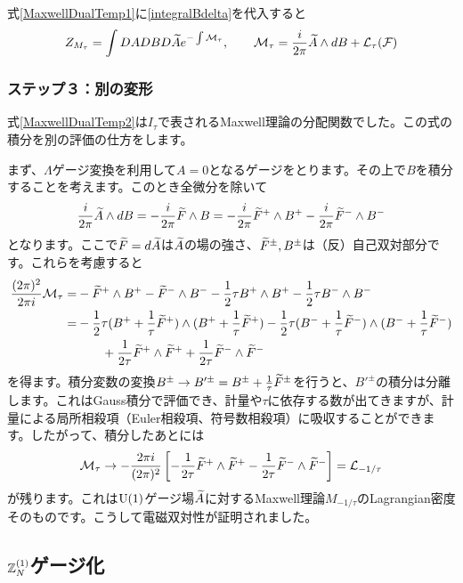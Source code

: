 \documentclass[generalized_symmetry.tex]{subfiles}
\begin{document}
式\eqref{MaxwellDualTemp1}に\eqref{integralBdelta}を代入すると
\begin{align}
  Z_{M_{\tau}}= \int DA DB D\widetilde{A} e^{-\int \mathcal{M}_{\tau}},\qquad \mathcal{M}_{\tau}=\frac{i}{2\pi}\widetilde{A} \wedge dB+\mathcal{L}_{\tau}(\mathcal{F})\label{MaxwellDualTemp2}
\end{align}

\subsubsection{ステップ３：別の変形}
式\eqref{MaxwellDualTemp2}は$I_{\tau}$で表されるMaxwell理論の分配関数でした。この式の積分を別の評価の仕方をします。

まず、$\Lambda$ゲージ変換を利用して$A=0$となるゲージをとります。その上で$B$を積分することを考えます。このとき全微分を除いて
\begin{align}
  \frac{i}{2\pi}\widetilde{A} \wedge dB=
  -\frac{i}{2\pi}\widetilde{F} \wedge B=
  -\frac{i}{2\pi}\widetilde{F}^{+} \wedge B^{+} -\frac{i}{2\pi}\widetilde{F}^{-} \wedge B^{-}
\end{align}
となります。ここで$\widetilde{F}=d\widetilde{A}$は$\widetilde{A}$の場の強さ、$\widetilde{F}^{\pm},B^{\pm}$は（反）自己双対部分です。これらを考慮すると
\begin{align}
  \frac{(2\pi)^2}{2\pi i}\mathcal{M}_{\tau}=&
  -\widetilde{F}^{+}\wedge B^{+}
  -\widetilde{F}^{-}\wedge B^{-}
  -\frac12 \tau B^{+}\wedge B^{+}
  -\frac12 \tau B^{-}\wedge B^{-}\notag\\
  =&
  -\frac12 \tau 
  (B^{+}+\frac{1}{\tau}\widetilde{F}^{+})\wedge
  (B^{+}+\frac{1}{\tau}\widetilde{F}^{+})
  -\frac12 \tau 
  (B^{-}+\frac{1}{\tau}\widetilde{F}^{-})\wedge
  (B^{-}+\frac{1}{\tau}\widetilde{F}^{-})\notag\\
  &\qquad+\frac{1}{2\tau}\widetilde{F}^{+}\wedge\widetilde{F}^{+}
  +\frac{1}{2\tau}\widetilde{F}^{-}\wedge\widetilde{F}^{-}
\end{align}
を得ます。積分変数の変換$B^{\pm}\to B'^{\pm}=B^{\pm}+\frac{1}{\tau}\widetilde{F}^{\pm}$を行うと、$B'^{\pm}$の積分は分離します。これはGauss積分で評価でき、計量や$\tau$に依存する数が出てきますが、計量による局所相殺項（Euler相殺項、符号数相殺項）に吸収することができます。したがって、積分したあとには
\begin{align}
  \mathcal{M}_{\tau}\to -\frac{2\pi i}{(2\pi)^2}\left[
  -\frac{1}{2\tau}\widetilde{F}^{+}\wedge\widetilde{F}^{+}
  -\frac{1}{2\tau}\widetilde{F}^{-}\wedge\widetilde{F}^{-}
  \right]=\mathcal{L}_{-1/\tau}
\end{align}
が残ります。これは$\mbox{U}(1)$ゲージ場$\widetilde{A}$に対するMaxwell理論$M_{-1/\tau}$のLagrangian密度そのものです。こうして電磁双対性が証明されました。

\subsection{$\mathbb{Z}_{N}^{(1)}$ゲージ化}
\end{document}
